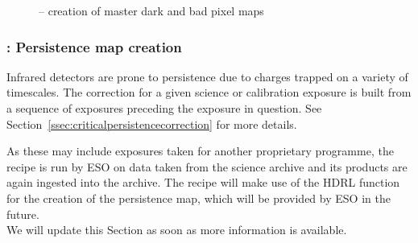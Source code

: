 \begin{figure}[hb]
  \centering
        \def \globalscale {0.700000}
        \fontsize{10}{12}\selectfont
        
  \caption[Recipe: ]{ -- creation of master
    dark and bad pixel maps}
  \label{Fig:rec_det_dark}
\end{figure}
\clearpage
\subsubsection{: Persistence map creation}
\label{sssec:metis_det_persistence}
\label{rec:metis_det_persistence}

Infrared detectors are prone to persistence due to charges trapped on a variety of timescales. The correction for a given science or
calibration exposure is built from a sequence of exposures preceding the exposure in question.
See Section~\ref{ssec:criticalpersistencecorrection} for more details.

As these may include exposures taken for another proprietary programme, the recipe is run by ESO on data taken from the science archive and its products are again ingested into the archive. The recipe will make use of the \ac{HDRL} function for the creation of the persistence map, which will be provided by \ac{ESO} in the future.\\
We will update this Section as soon as more information is available.



